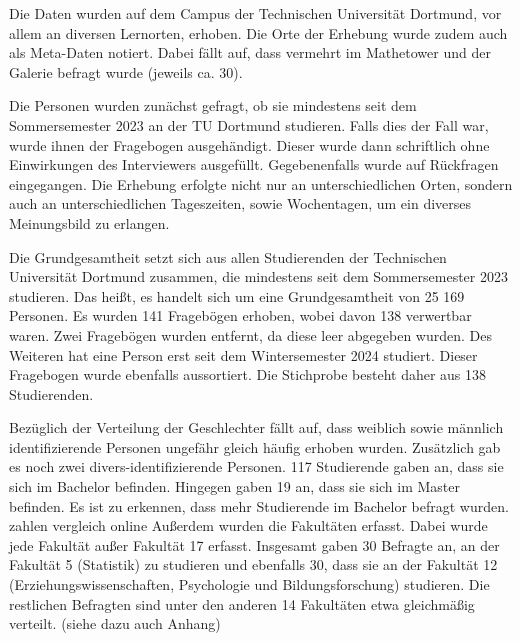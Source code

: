 \documentclass[11pt, a4paper]{article}
\begin{document}
	Die Daten wurden auf dem Campus der Technischen Universität Dortmund, vor allem an diversen Lernorten, erhoben. Die Orte der Erhebung wurde zudem auch als Meta-Daten notiert. Dabei fällt auf, dass vermehrt im Mathetower und der Galerie befragt wurde (jeweils ca. 30).
	
	Die Personen wurden zunächst gefragt, ob sie mindestens seit dem Sommersemester 2023 an der TU Dortmund studieren. Falls dies der Fall war, wurde ihnen der Fragebogen ausgehändigt. Dieser wurde dann schriftlich ohne Einwirkungen des Interviewers ausgefüllt. Gegebenenfalls wurde auf Rückfragen eingegangen.
	Die Erhebung erfolgte nicht nur an unterschiedlichen Orten, sondern auch an unterschiedlichen Tageszeiten, sowie Wochentagen, um ein diverses Meinungsbild zu erlangen.
	
	Die Grundgesamtheit setzt sich aus allen Studierenden der Technischen Universität Dortmund zusammen, die mindestens seit dem Sommersemester 2023 studieren. Das heißt, es handelt sich um eine Grundgesamtheit von 25 169 Personen. 
	Es wurden 141 Fragebögen erhoben, wobei davon 138 verwertbar waren. Zwei Fragebögen wurden entfernt, da diese leer abgegeben wurden. Des Weiteren hat eine Person erst seit dem Wintersemester 2024 studiert. Dieser Fragebogen wurde ebenfalls aussortiert.
	Die Stichprobe besteht daher aus 138 Studierenden.
	
	Bezüglich der Verteilung der Geschlechter fällt auf, dass weiblich sowie männlich identifizierende Personen ungefähr gleich häufig erhoben wurden. Zusätzlich gab es noch zwei divers-identifizierende Personen. 
	117 Studierende gaben an, dass sie sich im Bachelor befinden. Hingegen gaben 19 an, dass sie sich im Master befinden. Es ist zu erkennen, dass mehr Studierende im Bachelor befragt wurden. zahlen vergleich online
	Außerdem wurden die Fakultäten erfasst. Dabei wurde jede Fakultät außer Fakultät 17 erfasst. Insgesamt gaben 30 Befragte an, an der Fakultät 5 (Statistik) zu studieren und ebenfalls 30, dass sie an der Fakultät 12 (Erziehungswissenschaften, Psychologie und Bildungsforschung) studieren. Die restlichen Befragten sind unter den anderen 14 Fakultäten etwa gleichmäßig verteilt. (siehe dazu auch Anhang)
	
\end{document}
